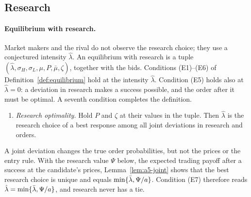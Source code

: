 \subsection{Research}\label{app:research}

\paragraph{Equilibrium with research.}
Market makers and the rival do not observe the research choice; they use a conjectured intensity
\(\hat\lambda\). An equilibrium with research is a tuple \((\hat\lambda,\sigma_H,\sigma_L,\mu,P,\bar\mu,\zeta)\),
together with the bids. Conditions (E1)--(E6) of Definition~\ref{def:equilibrium} hold at the intensity
\(\hat\lambda\). Condition (E5) holds also at \(\hat\lambda=0\): a deviation in research makes a success possible,
and the order after it must be optimal. A seventh condition completes the definition.
\begin{enumerate}[label=(E\arabic*),start=7,leftmargin=3em]
\item \emph{Research optimality.} Hold \(P\) and \(\zeta\) at their values in the tuple. Then \(\hat\lambda\) is
the research choice of a best response among all joint deviations in research and orders.
\end{enumerate}
A joint deviation changes the true order probabilities, but not the prices or the entry rule. With the research
value \(\Psi\) below, the expected trading payoff after a success at the candidate's prices,
Lemma~\ref{lem:a5-joint} shows that the best research choice is unique and equals \(\min\{\bar\lambda,\Psi/a\}\). Condition
(E7) therefore reads \(\hat\lambda=\min\{\bar\lambda,\Psi/a\}\), and research never has a tie.

